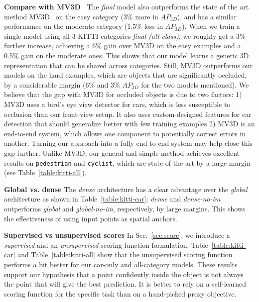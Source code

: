 \documentclass[10pt,twocolumn,letterpaper]{article}
\begin{document}
\noindent\textbf{Compare with MV3D~\cite{mv3d}} The \textit{final} model also outperforms the state of the art method MV3D~\cite{mv3d} on the easy category (3\% more in $AP_{3D}$), and has a similar performance on the moderate category (1.5\% less in $AP_{3D}$). When we train a single model using all 3 KITTI categories \textit{final (all-class)}, we roughly get a 3\% further increase, achieving
a 6\% gain over MV3D on the easy examples and a 0.5\% gain on the moderate ones. This shows that our model learns a generic 3D representation that can be shared across categories. Still, MV3D outperforms our models on the hard examples, which are objects that are significantly occluded, by a considerable margin (6\% and 3\% $AP_{3D}$ for the two models mentioned). We believe that the gap with MV3D for occluded objects is due to two factors: 1) MV3D uses a bird's eye view detector for cars, which is less susceptible to occlusion than our front-view setup. It also uses custom-designed features for car detection that should generalize better with few training examples 2) MV3D is an end-to-end system, which allows one component to potentially correct errors in another. Turning our approach into a fully end-to-end system may help close this gap further. 
Unlike MV3D, our general and simple method achieves excellent results on \texttt{pedestrian} and \texttt{cyclist}, which are state of the art by a large margin (see Table~\ref{table:kitti-all}).

\noindent\textbf{Global vs. dense} The \textit{dense} architecture has a clear advantage over the \textit{global} architecture as shown in Table~\ref{table:kitti-car}: \textit{dense} and \textit{dense-no-im} outperforms \textit{global} and \textit{global-no-im}, respectively, by large margins. This shows the effectiveness of using input points as spatial anchors. 

\noindent\textbf{Supervised vs unsupervised scores} In Sec.~\ref{sec:score}, we introduce a \textit{supervised} and an \textit{unsupervised} scoring function formulation. Table~\ref{table:kitti-car} and Table~\ref{table:kitti-all} show that the unsupervised scoring function performs a bit better for our car-only and all-category models. These results support our hypothesis that a point confidently inside the object is not always the point that will give the best prediction. It is better to rely on a self-learned scoring function for the specific task than on a hand-picked proxy objective.
\end{document}
